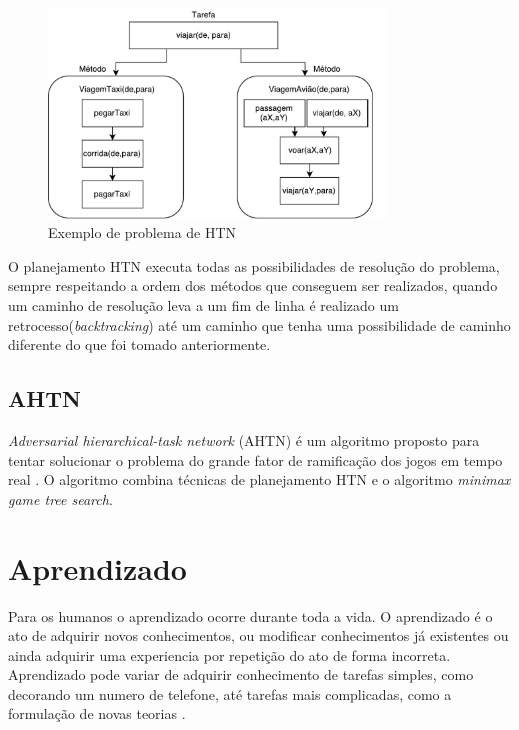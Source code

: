 \begin{figure}[ht]
	\centering
	\includegraphics[width=0.8\textwidth]{fig/travelmethod.pdf}
	\caption{Exemplo de problema de HTN}
	\label{fig:travelmethods}
\end{figure}  

O planejamento HTN executa todas as possibilidades de resolução do problema, sempre respeitando a ordem dos métodos que conseguem ser realizados, quando um caminho de resolução leva a um fim de linha é realizado um retrocesso(\textit{backtracking}) até um caminho que tenha uma possibilidade de caminho diferente do que foi tomado anteriormente.

\subsection{AHTN} 

\textit{Adversarial hierarchical-task network} (AHTN) é um algoritmo proposto para tentar solucionar o problema do grande fator de ramificação dos jogos em tempo real \cite{ontanon2015adversarial}. O algoritmo combina técnicas de planejamento HTN e o algoritmo \textit{minimax game tree search}. 

\section{Aprendizado} 
Para os humanos o aprendizado ocorre durante toda a vida. 
O aprendizado é o ato de adquirir novos conhecimentos, ou modificar conhecimentos já existentes ou ainda adquirir uma experiencia por repetição do ato de forma incorreta. 
Aprendizado pode variar de adquirir conhecimento de tarefas simples, como decorando um numero de telefone, até tarefas mais complicadas, como a formulação de novas teorias \cite{intelligence2003modern}. 

